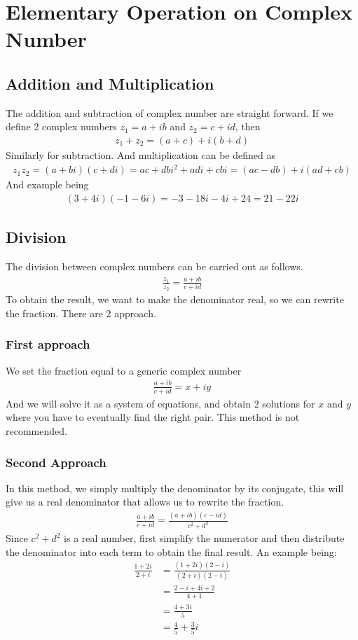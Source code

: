 \documentclass[12pt]{book}
\begin{document}
\section{Elementary Operation on Complex Number}
\subsection{Addition and Multiplication}
The addition and subtraction of complex number are straight forward. If we define 2 complex numbers $z_1 = a+ib$ and $z_2 = c+id$, then
\begin{align}
    z_1+z_2 = (a+c)+i(b+d)
\end{align}
Similarly for subtraction. And multiplication can be defined as
\begin{align}
    z_1z_2 = (a+bi)(c+di) = ac + dbi^2 + adi + cbi = (ac-db)+i(ad+cb)
\end{align}
And example being
\begin{align}
    (3+4i)(-1-6i) = -3-18i-4i+24 = 21-22i
\end{align}
\subsection{Division}
The division between complex numbers can be carried out as follows.
\begin{align}
    \frac{z_1}{z_2} = \frac{a+ib}{c+id} 
\end{align}
To obtain the result, we want to make the denominator real, so we can rewrite the fraction. There are 2 approach. 
\subsubsection{First approach}
We set the fraction equal to a generic complex number
\begin{align}
    \frac{a+ib}{c+id}  = x+iy
\end{align}
And we will solve it as a system of equations, and obtain 2 solutions for $x$ and $y$ where you have to eventually find the right pair. This method is not recommended. 
\subsubsection{Second Approach}
In this method, we simply multiply the denominator by its conjugate, this will give us a real denominator that allows us to rewrite the fraction. 
\begin{align}
    \frac{a+ib}{c+id} = \frac{(a+ib)(c-id)}{c^2+d^2}
\end{align}
Since $c^2 + d^2$ is a real number, first simplify the numerator and then distribute the denominator into each term to obtain the final result. An example being:
\begin{align*}
    \frac{1+2i}{2+i} &= \frac{(1+2i)(2-i)}{(2+i)(2-i)}\\
                     &= \frac{2 - i + 4i + 2}{4+1}\\
                     &= \frac{4+3i}{5}\\
                     &=\frac{4}{5}+\frac{3}{5}i
\end{align*}
\end{document}
